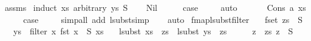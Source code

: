 \begin{isabellebody}
%
\isadelimproof
%
\endisadelimproof
%
\isatagproof
{}\isamarkupfalse%
\ assms\isanewline
{}\isamarkupfalse%
\ {\isacharparenleft}{\kern0pt}induct\ xs\ arbitrary{\isacharcolon}{\kern0pt}\ ys\ S{\isacharparenright}{\kern0pt}\isanewline
\ \ \isamarkupfalse%
\ Nil\isanewline
\ \ \isamarkupfalse%
\ \isamarkupfalse%
\ {\isacharquery}{\kern0pt}case\ \isanewline
\ \ \isamarkupfalse%
\ auto\isanewline
\ \ \isamarkupfalse%
\isanewline
{}\isamarkupfalse%
\isanewline
\ \ \isamarkupfalse%
\ {\isacharparenleft}{\kern0pt}Cons\ a\ xs{\isacharparenright}{\kern0pt}\isanewline
\ \ \isamarkupfalse%
\ \isamarkupfalse%
\ {\isacharquery}{\kern0pt}case\ \isanewline
\ \ \isamarkupfalse%
\ {\isacharparenleft}{\kern0pt}simp{\isacharunderscore}{\kern0pt}all\ add{\isacharcolon}{\kern0pt}\ lsubst{\isacharunderscore}{\kern0pt}simp{\isacharparenright}{\kern0pt}\isanewline
\ \ \isamarkupfalse%
\ auto\isanewline
{}\isamarkupfalse%
%
\endisatagproof
{\isafoldproof}%
%
\isadelimproof
\isanewline
%
\endisadelimproof
\isanewline
\isanewline
{}\isamarkupfalse%
\ fmap{\isacharunderscore}{\kern0pt}lsubst{\isacharunderscore}{\kern0pt}filter{\isacharcolon}{\kern0pt}\isanewline
\ \ \ {\isachardoublequoteopen}fset\ zs\ {\isasymsubseteq}\ S{\isachardoublequoteclose}\isanewline
\ \ \ {\isachardoublequoteopen}ys\ {\isacharequal}{\kern0pt}\ filter\ {\isacharparenleft}{\kern0pt}{\isasymlambda}x{\isachardot}{\kern0pt}\ fst\ x\ {\isasymin}\ S{\isacharparenright}{\kern0pt}\ xs{\isachardoublequoteclose}\isanewline
\ \ \ {\isachardoublequoteopen}{\isacharparenleft}{\kern0pt}lsubst\ xs{\isacharparenright}{\kern0pt}\ {\isacharbar}{\kern0pt}{\isacharbackquote}{\kern0pt}{\isacharbar}{\kern0pt}\ zs\ {\isacharequal}{\kern0pt}\ {\isacharparenleft}{\kern0pt}lsubst\ ys{\isacharparenright}{\kern0pt}\ {\isacharbar}{\kern0pt}{\isacharbackquote}{\kern0pt}{\isacharbar}{\kern0pt}\ zs{\isachardoublequoteclose}\isanewline
%
\isadelimproof
%
\endisadelimproof
%
\isatagproof
{}\isamarkupfalse%
\ {\isacharminus}{\kern0pt}\isanewline
\ \ \isamarkupfalse%
\ {\isachardoublequoteopen}{\isasymforall}z\ {\isacharbar}{\kern0pt}{\isasymin}{\isacharbar}{\kern0pt}\ zs{\isachardot}{\kern0pt}\ z\ {\isasymin}\ S{\isachardoublequoteclose}\isanewline

\end{isabellebody}
